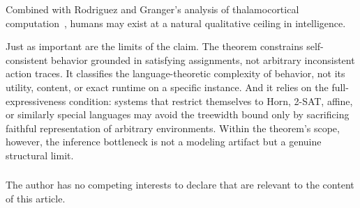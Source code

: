 \documentclass[runningheads]{llncs}
\begin{document}
Combined with Rodriguez and Granger's analysis of thalamocortical computation~\cite{Rodriguez16}, humans may exist at a natural qualitative ceiling in intelligence.

Just as important are the limits of the claim. The theorem constrains self-consistent behavior grounded in satisfying assignments, not arbitrary inconsistent action traces. It classifies the language-theoretic complexity of behavior, not its utility, content, or exact runtime on a specific instance. And it relies on the full-expressiveness condition: systems that restrict themselves to Horn, 2-SAT, affine, or similarly special languages may avoid the treewidth bound only by sacrificing faithful representation of arbitrary environments. Within the theorem's scope, however, the inference bottleneck is not a modeling artifact but a genuine structural limit.

\begin{credits}
\subsubsection{\discintname}
The author has no competing interests to declare that are relevant to the content of this article.
\end{credits}
\end{document}
